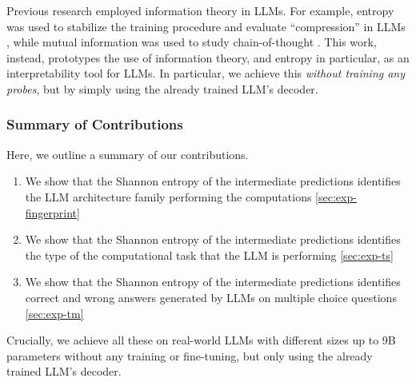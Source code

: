Previous research employed information theory in LLMs. For example, entropy was used to stabilize the training procedure \cite{10.5555/3618408.3620117} and evaluate ``compression'' in LLMs \cite{wei2024differanknovelrankbasedmetric}, while mutual information was used to study chain-of-thought \cite{ton2024understandingchainofthoughtllmsinformation}. \newline
This work, instead, prototypes the use of information theory, and entropy in particular, as an interpretability tool for LLMs. In particular, we achieve this \textit{without training any probes}, but by simply using the already trained LLM's decoder.

\subsubsection*{Summary of Contributions}
Here, we outline a summary of our contributions. 
\begin{enumerate}
    \item We show that the Shannon entropy of the intermediate predictions identifies the LLM architecture family performing the computations \ref{sec:exp-fingerprint}
    \item We show that the Shannon entropy of the intermediate predictions identifies the type of the computational task that the LLM is performing \ref{sec:exp-ts}
    \item We show that the Shannon entropy of the intermediate predictions identifies correct and wrong answers generated by LLMs on multiple choice questions \ref{sec:exp-tm}
\end{enumerate}
Crucially, we achieve all these on real-world LLMs with different sizes up to 9B parameters without any training or fine-tuning, but only using the already trained LLM's decoder.


